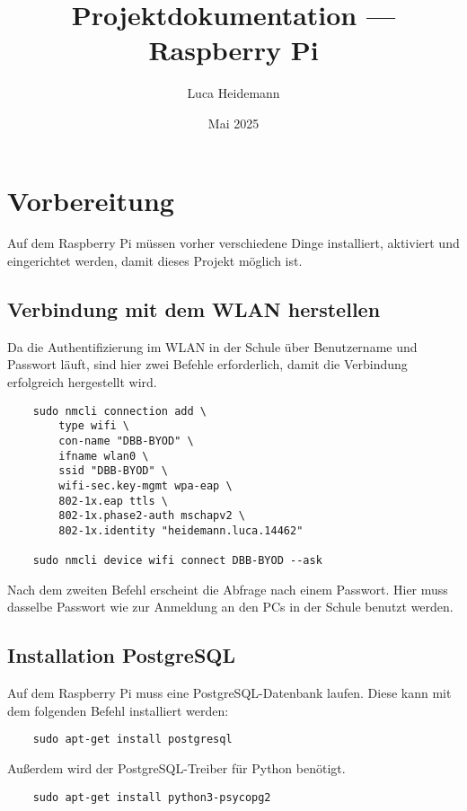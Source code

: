 \documentclass{article}
\title{Projektdokumentation — Raspberry Pi}
\author{Luca Heidemann}
\date{Mai 2025}
\begin{document}
\maketitle
\newpage

\section{Vorbereitung}
Auf dem Raspberry Pi müssen vorher verschiedene Dinge installiert, aktiviert und eingerichtet werden, damit dieses Projekt möglich ist.
\subsection{Verbindung mit dem WLAN herstellen}
Da die Authentifizierung im WLAN in der Schule über Benutzername und Passwort läuft, sind hier zwei Befehle erforderlich, damit die Verbindung erfolgreich hergestellt wird.
\begin{verbatim}
    sudo nmcli connection add \
        type wifi \
        con-name "DBB-BYOD" \
        ifname wlan0 \
        ssid "DBB-BYOD" \
        wifi-sec.key-mgmt wpa-eap \
        802-1x.eap ttls \
        802-1x.phase2-auth mschapv2 \
        802-1x.identity "heidemann.luca.14462"

    sudo nmcli device wifi connect DBB-BYOD --ask
\end{verbatim}
Nach dem zweiten Befehl erscheint die Abfrage nach einem Passwort. Hier muss dasselbe Passwort wie zur Anmeldung an den PCs in der Schule benutzt werden.
\subsection{Installation PostgreSQL}
Auf dem Raspberry Pi muss eine PostgreSQL-Datenbank laufen. Diese kann mit dem folgenden Befehl installiert werden:
\begin{verbatim}
    sudo apt-get install postgresql
\end{verbatim}
Außerdem wird der PostgreSQL-Treiber für Python benötigt.
\begin{verbatim}
    sudo apt-get install python3-psycopg2
\end{verbatim}
\end{document}
